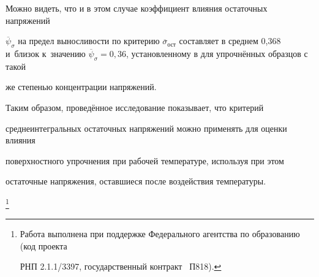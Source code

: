 Можно видеть, что и в этом случае коэффициент влияния остаточных напряжений

$\overline \psi_\sigma$ на предел выносливости по критерию $\overline \sigma_\text{ост}$ составляет в среднем 0{,}368 и~близок к~значению $\overline

\psi_\sigma =0{,}36$, установленному в \cite{kirpichev10:pavlov08} для упрочнённых образцов с такой

же степенью концентрации напряжений.



Таким образом, проведённое исследование показывает, что критерий

среднеинтегральных остаточных напряжений можно применять для оценки влияния

поверхностного упрочнения при рабочей температуре, используя при этом

остаточные напряжения, оставшиеся после воздействия температуры.



\thanks{Работа выполнена при поддержке Федерального агентства по образованию {\rm(}код проекта

РНП {\rm2.1.1/3397,} государственный контракт {\rm \No~П818).}}



